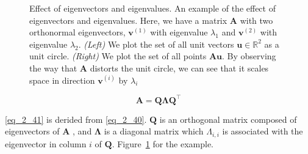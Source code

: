 \begin{itemize}
\begin{figure}[ht]
\begin{center}
      \caption{Effect of eigenvectors and eigenvalues. An example of the effect of eigenvectors and eigenvalues. Here, we have a matrix $\bm{A}$ with two orthonormal eigenvectors, $\bm{v} ^ {(1)}$ with eigenvalue $\lambda _ 1$ and $\bm{v} ^ {(2)}$ with eigenvalue $\lambda _ 2$. \textit{(Left)} We plot the set of all unit vectors $\bm{u} \in {\mathbb{R}} ^ 2$ as a unit circle. \textit{(Right)} We plot the set of all points $\bm{Au}$. By observing the way that $\bm{A}$ distorts the unit circle, we can see that it scales space in direction $\bm{v} ^ {(i)}$ by $\lambda _ i$}
      \label{fig:effect_of_eigenvectors_and_eigen_values}
    \end{center}
  \end{figure}

  \begin{equation} \tag{2.41}
    \label{eq_2_41}
    \bm{A} = \bm{Q} \bm{\Lambda} \bm{Q} ^ \top
  \end{equation}

  \eqref{eq_2_41} is derided from \eqref{eq_2_40}.
  $\bm{Q}$ is an orthogonal matrix composed of eigenvectors of $\bm{A}$
  , and $\bm{\Lambda}$ is a diagonal matrix which $\Lambda _ {i,i}$ is associated with the eigenvector in column $i$ of $\bm{Q}$.
  Figure~\ref{fig:effect_of_eigenvectors_and_eigen_values} for the example.


\end{itemize}
